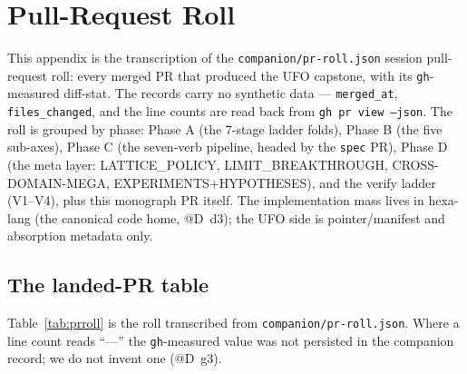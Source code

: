 \section{Pull-Request Roll}
\label{app:prroll}

This appendix is the transcription of the
\texttt{companion/pr-roll.json} session pull-request roll: every merged
PR that produced the UFO capstone, with its \texttt{gh}-measured
diff-stat. The records carry no synthetic data ---
\texttt{merged\_at}, \texttt{files\_changed}, and the line counts are
read back from \texttt{gh pr view --json}. The roll is grouped by phase:
Phase A (the 7-stage ladder folds), Phase B (the five sub-axes), Phase C
(the seven-verb pipeline, headed by the \texttt{spec} PR), Phase D (the
meta layer: LATTICE\_POLICY, LIMIT\_BREAKTHROUGH, CROSS-DOMAIN-MEGA,
EXPERIMENTS$+$HYPOTHESES), and the verify ladder (V1--V4), plus this
monograph PR itself. The implementation mass lives in hexa-lang (the
canonical code home, @D~d3); the UFO side is pointer/manifest and
absorption metadata only.

\subsection{The landed-PR table}
\label{app:prroll-table}

Table~\ref{tab:prroll} is the roll transcribed from
\texttt{companion/pr-roll.json}. Where a line count reads ``---'' the
\texttt{gh}-measured value was not persisted in the companion record; we
do not invent one (@D~g3).

